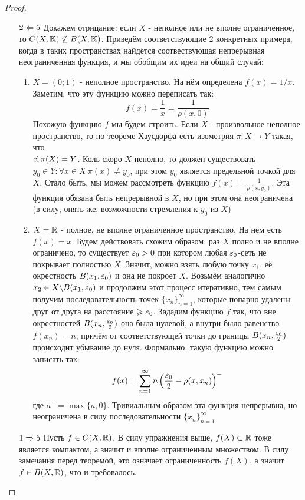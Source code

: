 \begin{proof}
\begin{enumerate}
		\item[$2 \Leftarrow 5$] Докажем отрицание: если $X$ - неполное или не вполне ограниченное, то $C(X, \K) \centernot\subseteq B(X, \K)$. Приведём соответствующие 2 конкретных примера, когда в таких пространствах найдётся соотвествующая непрерывная неограниченная функция, и мы обобщим их идеи на общий случай:
		\begin{enumerate}
			\item $X = (0; 1)$ - неполное пространство. На нём определена $f(x) = 1 / x$. Заметим, что эту функцию можно переписать так:
			\[
				f(x) = \frac{1}{x} = \frac{1}{\rho(x, 0)}
			\]
			Похожую функцию $f$ мы будем строить. Если $X$ - произвольное неполное пространство, то по теореме Хаусдорфа есть изометрия $\pi \colon X \to Y$ такая, что \\ $\operatorname{cl} \pi(X) = Y$. Коль скоро $X$ неполно, то должен существовать $y_0 \in Y \colon \forall x \in X\ \pi(x) \neq y_0$, при этом $y_0$ является предельной точкой для $X$. Стало быть, мы можем рассмотреть функцию $f(x) = \frac{1}{\rho(x, y_0)}$. Эта функция обязана быть непрерывной в $X$, но при этом она неограничена (в силу, опять же, возможности стремления к $y_0$ из $X$)
			
			\item $X = \mathbb{R}$ - полное, не вполне ограниченное пространство. На нём есть $f(x) = x$. Будем действовать схожим образом: раз $X$ полно и не вполне ограничено, то существует $\varepsilon_0 > 0$ при котором любая $\varepsilon_0$-сеть не покрывает полностью $X$. Значит, можно взять любую точку $x_1$, её окрестность $B(x_1, \varepsilon_0)$ и она не покроет $X$. Возьмём аналогично $x_2 \in X \backslash B(x_1, \varepsilon_0)$ и продолжим этот процесс итеративно, тем самым получим последовательность точек $\{x_n\}_{n = 1}^\infty$, которые попарно удалены друг от друга на расстояние $\geqslant \varepsilon_0$. Зададим функцию $f$ так, что вне окрестностей $B(x_n, \frac{\varepsilon_0}{2})$ она была нулевой, а внутри было равенство $f(x_n) = n$, причём от соответствующей точки до границы $B(x_n, \frac{\varepsilon_0}{2})$ происходит убывание до нуля. Формально, такую функцию можно записать так:
			\[
				f(x) = \sum_{n = 1}^\infty n\left(\frac{\varepsilon_0}{2} - \rho(x, x_n)\right)^+
			\]
			где $a^+ = \max\{a, 0\}$. Тривиальным образом эта функция непрерывна, но неограничена в силу последовательности $\{x_n\}_{n = 1}^\infty$
		\end{enumerate}
	
		\item[$1 \Rightarrow 5$] Пусть $f \in C(X, \mathbb{R})$. В силу упражнения выше, $f(X) \subset \mathbb{R}$ тоже является компактом, а значит и вполне ограниченным множеством. В силу замечания перед теоремой, это означает ограниченность $f(X)$, а значит $f \in B(X, \mathbb{R})$, что и требовалось.
	\end{enumerate}
\end{proof}